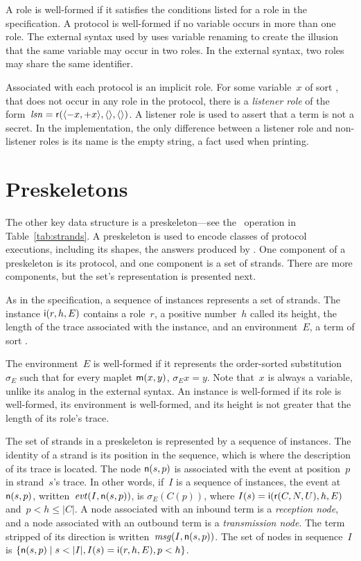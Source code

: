 \documentclass[12pt]{report}
\theoremstyle{definition}
\begin{document}
A role is well-formed if it satisfies the
conditions listed for a role in the specification.  A protocol is
well-formed if no variable occurs in more than one role.  The external
syntax used by {\cpsa} uses variable renaming to create the illusion
that the same variable may occur in two roles.  In the external
syntax, two roles may share the same identifier.

Associated with each protocol is an implicit role.  For some
variable~$x$ of sort , that does not occur in any role in
the protocol, there is a \label{def:listener
  role}\emph{listener role}
of the form~$\operatorname{\mathit{lsn}} = \operatorname{\mathsf{r}}(\langle\mathord - x,\mathord + x\rangle, \langle\rangle,
\langle\rangle)$.  A listener role is used to assert that a term is not a
secret.  In the implementation, the only difference between a listener
role and non-listener roles is its name is the empty string, a fact
used when printing.

\section{Preskeletons}

The other key {\cpsa} data structure is a preskeleton---see the~
operation in Table~\ref{tab:strands}.  A preskeleton is used to encode
classes of protocol executions, including its shapes, the answers
produced by {\cpsa}.  One component of a preskeleton is its protocol,
and one component is a set of strands.  There are more components, but
the set's representation is presented next.

As in the specification, a sequence of instances represents a set of
strands.  The instance $\operatorname{\mathsf{i}}(r,h,E)$ contains a
role~$r$, a positive number~$h$ called its height, the length of the
trace associated with the instance, and an
environment~$E$, a term of sort 
.

The environment~$E$ is well-formed if it represents the order-sorted
substitution~$\sigma_E$ such that for every maplet $\operatorname{\mathsf{m}}(x,y)$,
$\sigma_E x=y$.  Note that~$x$ is always a variable, unlike its analog
in the external syntax.  An instance is well-formed if its role is
well-formed, its environment is well-formed, and its height is not
greater that the length of its role's trace.

The set of strands in a preskeleton is represented by a sequence of
instances.  The identity of a strand is its position in
the sequence, which is where the description of its trace is located.
The node $\operatorname{\mathsf{n}}(s,p)$ is associated with the event
at position~$p$ in strand~$s$'s trace.  In other words, if~$I$ is
a sequence of instances, the event at $\operatorname{\mathsf{n}}(s,p)$,
\label{def:evt}written~$\operatorname{\mathit{evt}}(I,\operatorname{\mathsf{n}}(s,p))$, is $\sigma_E(C(p))$, where
$I(s)=\operatorname{\mathsf{i}}(\operatorname{\mathsf{r}}(C,N,U),h,E)$ and~$p<h\leq|C|$.  A node
associated with an inbound term is a \emph{reception node}, and a node associated with an outbound
term is a \emph{transmission node}.  The term
stripped of its direction is written~$\operatorname{\mathit{msg}}(I,\operatorname{\mathsf{n}}(s,p))$.  The
set of nodes in sequence~$I$ is $\{\cn{n}(s,p) \mid s<|I|,
I(s)=\cn{i}(r,h,E), p < h\}$.
\end{document}
